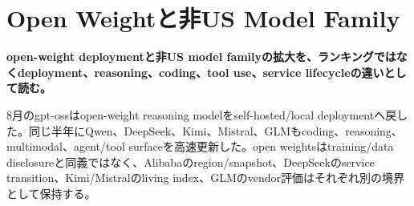 \section{Open Weightと非US Model Family}
\label{pkg:open}
\noindent\textbf{open-weight deploymentと非US model familyの拡大を、ランキングではなくdeployment、reasoning、coding、tool use、service lifecycleの違いとして読む。}\autocite{src-12865e8612c7,src-1c46fdf17c79}

8月のgpt-ossはopen-weight reasoning modelをself-hosted/local deploymentへ戻した。同じ半年にQwen、DeepSeek、Kimi、Mistral、GLMもcoding、reasoning、multimodal、agent/tool surfaceを高速更新した。open weightsはtraining/data disclosureと同義ではなく、Alibabaのregion/snapshot、DeepSeekのservice transition、Kimi/Mistralのliving index、GLMのvendor評価はそれぞれ別の境界として保持する。\autocite{src-12865e8612c7,src-1c46fdf17c79,src-9156c37fb1c2,src-9191d43918fc,src-d8b7c1c36830,src-e547d0d8cbe3,src-eac8dfbeb78c}
